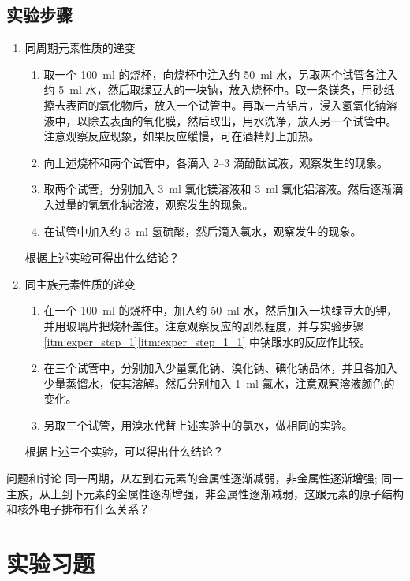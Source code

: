 \subsection*{实验步骤}
\begin{enumerate}[1.]
  \item\label{itm:exper_step_1} 同周期元素性质的递变
  \begin{enumerate}[(1)]
    \item\label{itm:exper_step_1_1} 取一个 \qty{100}{ml} 的烧杯，向烧杯中注入约 \qty{50}{ml} 水，另取两个试管各注入约 \qty{5}{ml} 水，然后取绿豆大的一块钠，放入烧杯中。取一条镁条，用砂纸擦去表面的氧化物后，放入一个试管中。再取一片铝片，浸入氢氧化钠溶液中，以除去表面的氧化膜，然后取出，用水洗净，放入另一个试管中。注意观察反应现象，如果反应缓慢，可在酒精灯上加热。
    \item 向上述烧杯和两个试管中，各滴入 \numrange{2}{3} 滴酚酞试液，观察发生的现象。
    \item 取两个试管，分别加入 \qty{3}{ml} 氯化镁溶液和 \qty{3}{ml} 氯化铝溶液。然后逐渐滴入过量的氢氧化钠溶液，观察发生的现象。
    \item 在试管中加入约 \qty{3}{ml} 氢硫酸，然后滴入氯水，观察发生的现象。
  \end{enumerate}
  \par\medskip
  根据上述实验可得出什么结论？
  \item 同主族元素性质的递变
  \begin{enumerate}[(1)]
    \item 在一个 \qty{100}{ml} 的烧杯中，加人约 \qty{50}{ml} 水，然后加入一块绿豆大的钾，并用玻璃片把烧杯盖住。注意观察反应的剧烈程度，并与实验步骤 \ref{itm:exper_step_1}\ref{itm:exper_step_1_1} 中钠跟水的反应作比较。
    \item 在三个试管中，分别加入少量氯化钠、溴化钠、碘化钠晶体，并且各加入少量蒸馏水，使其溶解。然后分别加入 \qty{1}{ml} 氯水，注意观察溶液颜色的变化。
    \item 另取三个试管，用溴水代替上述实验中的氯水，做相同的实验。
  \end{enumerate}
  \par\medskip
  根据上述三个实验，可以得出什么结论？
\end{enumerate}
\begin{Theorem}{问题和讨论}
同一周期，从左到右元素的金属性逐渐减弱，非金属性逐渐增强; 同一主族，从上到下元素的金属性逐渐增强，非金属性逐渐减弱，这跟元素的原子结构和核外电子排布有什么关系？
\end{Theorem}

\section{实验习题}
